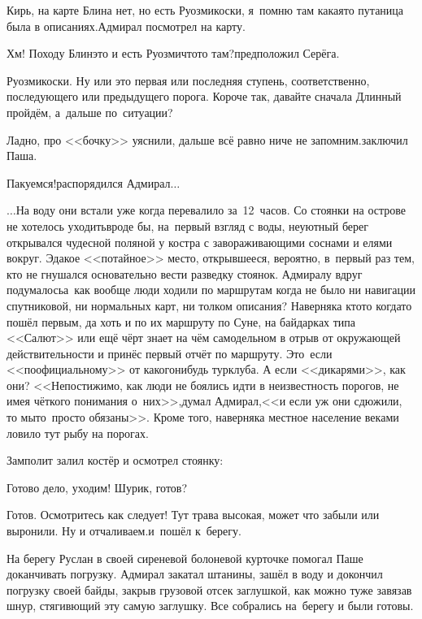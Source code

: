 \diagdash Кирь, на карте Блина нет, но есть Руозмикоски, я~помню там какая\sdash то путаница была в описаниях.\mdash Адмирал посмотрел на карту.

\diagdash Хм! Походу Блин\mdash это и есть Руозми\sdash что\sdash то там?\diagdash предположил Серёга.

\diagdash Руозмикоски. Ну или это первая или последняя ступень, соответственно, последующего или предыдущего порога. Короче так, давайте сначала Длинный пройдём, а~дальше по~ситуации?

\diagdash Ладно, про <<бочку>> уяснили, дальше всё равно ниче не запомним.\mdash заключил Паша.

\diagdash Пакуемся!\mdash распорядился Адмирал$\ldots$

\vspace{0.5cm}
$\ldots$На воду они встали уже когда перевалило за~12~часов. Со стоянки на острове не хотелось уходить\mdash вроде бы, на~первый взгляд с воды, неуютный берег открывался чудесной поляной у костра с завораживающими соснами и елями вокруг. Эдакое <<потайное>> место, открывшееся, вероятно, в~первый раз тем, кто не гнушался основательно вести разведку стоянок. Адмиралу вдруг подумалось\mdash а~как вообще люди ходили по маршрутам когда не было ни навигации спутниковой, ни нормальных карт, ни толком описания? Наверняка кто\sdash то когда\sdash то пошёл первым, да хоть и по их маршруту по Суне, на байдарках типа <<Салют>> или ещё чёрт знает на чём самодельном в отрыв от окружающей действительности и принёс первый отчёт по маршруту. Это~если <<по\sdash официальному>> от какого\sdash нибудь турклуба. А если <<дикарями>>, как они? <<Непостижимо, как люди не боялись идти в неизвестность порогов, не имея чёткого понимания о~них>>,\mdash думал Адмирал,\mdash <<и если уж они сдюжили, то мы\sdash то~просто обязаны>>. Кроме того, наверняка местное население веками ловило тут рыбу на порогах.

Замполит залил костёр и осмотрел стоянку:

\diagdash Готово дело, уходим! Шурик, готов?

\diagdash Готов. Осмотритесь как следует! Тут трава высокая, может что забыли или выронили. Ну и отчаливаем.\mdash и~пошёл к~берегу.

На берегу Руслан в своей сиреневой болоневой курточке помогал Паше доканчивать погрузку. Адмирал закатал штанины, зашёл в воду и докончил погрузку своей байды, закрыв грузовой отсек заглушкой, как можно туже завязав шнур, стягивющий эту самую заглушку. Все собрались на~берегу и были готовы. 

